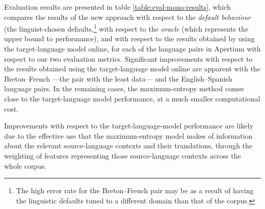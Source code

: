 \documentclass[11pt]{article}
\newcommand{\comment}[1]{\todo{#1}}
\begin{document}
 Evaluation results are presented in 
 table \ref{table:eval-mono-results}, which compares the results of
 the new approach with respect to the \emph{default behaviour} (the
 linguist-chosen defaults,\footnote{The high error rate
   for the Breton--French pair may be as a result of having the
   linguistic defaults tuned to a different domain than that of the
   corpus.}  with respect to the \emph{oracle} (which represents the
 upper bound to performance), and with respect to the results obtained
 by using the target-language model online, for each of the language
 pairs in Apertium with respect to our two evaluation metrics.
 Significant improvements with respect to the results obtained using
 the target-language model online are apparent with the Breton--French
 ---the pair with the least data--- and the English--Spanish language
 pairs. In the remaining cases, the maximum-entropy method comes close
 to the target-language model performance, at a much smaller
 computational cost.



 Improvements with respect to the target-language-model performance
 are likely due to the effective use that the maximum-entropy model
 makes of information about the relevant source-language contexts and
 their translations, through the weighting of features representing
 those source-language contexts across the whole corpus.

\end{document}
